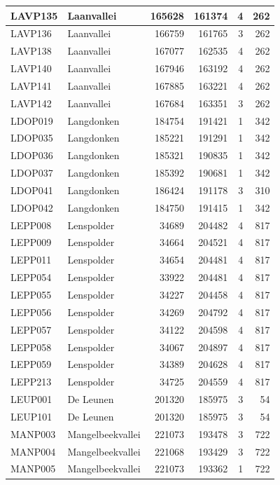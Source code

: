 \documentclass[11pt,]{book}
\begin{document}
\begin{table}
\begin{tabular}[t]{l|l|r|r|r|r}
\hline
LAVP135 & Laanvallei & 165628 & 161374 & 4 & 262\\
\hline
LAVP136 & Laanvallei & 166759 & 161765 & 3 & 262\\
\hline
LAVP138 & Laanvallei & 167077 & 162535 & 4 & 262\\
\hline
LAVP140 & Laanvallei & 167946 & 163192 & 4 & 262\\
\hline
LAVP141 & Laanvallei & 167885 & 163221 & 4 & 262\\
\hline
LAVP142 & Laanvallei & 167684 & 163351 & 3 & 262\\
\hline
LDOP019 & Langdonken & 184754 & 191421 & 1 & 342\\
\hline
LDOP035 & Langdonken & 185221 & 191291 & 1 & 342\\
\hline
LDOP036 & Langdonken & 185321 & 190835 & 1 & 342\\
\hline
LDOP037 & Langdonken & 185392 & 190681 & 1 & 342\\
\hline
LDOP041 & Langdonken & 186424 & 191178 & 3 & 310\\
\hline
LDOP042 & Langdonken & 184750 & 191415 & 1 & 342\\
\hline
LEPP008 & Lenspolder & 34689 & 204482 & 4 & 817\\
\hline
LEPP009 & Lenspolder & 34664 & 204521 & 4 & 817\\
\hline
LEPP011 & Lenspolder & 34654 & 204481 & 4 & 817\\
\hline
LEPP054 & Lenspolder & 33922 & 204481 & 4 & 817\\
\hline
LEPP055 & Lenspolder & 34227 & 204458 & 4 & 817\\
\hline
LEPP056 & Lenspolder & 34269 & 204792 & 4 & 817\\
\hline
LEPP057 & Lenspolder & 34122 & 204598 & 4 & 817\\
\hline
LEPP058 & Lenspolder & 34067 & 204897 & 4 & 817\\
\hline
LEPP059 & Lenspolder & 34389 & 204628 & 4 & 817\\
\hline
LEPP213 & Lenspolder & 34725 & 204559 & 4 & 817\\
\hline
LEUP001 & De Leunen & 201320 & 185975 & 3 & 54\\
\hline
LEUP101 & De Leunen & 201320 & 185975 & 3 & 54\\
\hline
MANP003 & Mangelbeekvallei & 221073 & 193478 & 3 & 722\\
\hline
MANP004 & Mangelbeekvallei & 221068 & 193429 & 3 & 722\\
\hline
MANP005 & Mangelbeekvallei & 221073 & 193362 & 1 & 722\\

\end{tabular}
\end{table}
\end{document}
